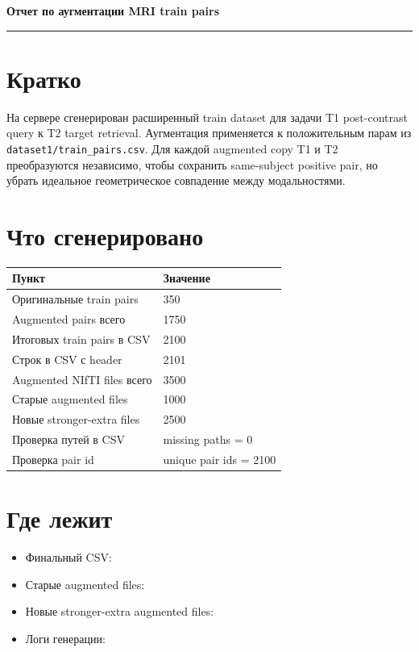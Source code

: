 \documentclass[10pt,a4paper]{article}
\begin{document}
{\Large\bfseries Отчет по аугментации MRI train pairs}

\vspace{4pt}
{\color{headerblue}\rule{\linewidth}{1.2pt}}

\section*{Кратко}

На сервере сгенерирован расширенный train dataset для задачи T1 post-contrast
query к T2 target retrieval. Аугментация применяется к положительным парам из
\texttt{dataset1/train\_pairs.csv}. Для каждой augmented copy T1 и T2
преобразуются независимо, чтобы сохранить same-subject positive pair, но
убрать идеальное геометрическое совпадение между модальностями.

\section*{Что сгенерировано}

\begin{tabularx}{\linewidth}{@{}lX@{}}
\toprule
Пункт & Значение \\
\midrule
Оригинальные train pairs & 350 \\
Augmented pairs всего & 1750 \\
Итоговых train pairs в CSV & 2100 \\
Строк в CSV с header & 2101 \\
Augmented NIfTI files всего & 3500 \\
Старые augmented files & 1000 \\
Новые stronger-extra files & 2500 \\
Проверка путей в CSV & missing paths = 0 \\
Проверка pair id & unique pair ids = 2100 \\
\bottomrule
\end{tabularx}

\section*{Где лежит}

\begin{itemize}
  \item Финальный CSV:
  \item Старые augmented files:
  \item Новые stronger-extra augmented files:
  \item Логи генерации:
\end{itemize}
\end{document}
